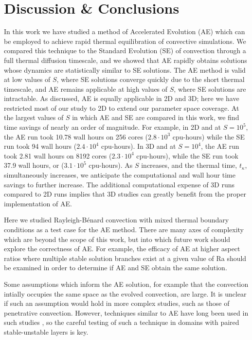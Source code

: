 \documentclass[aps, pre, onecolumn, nofootinbib, notitlepage, groupedaddress, amsfonts, amssymb, amsmath, longbibliography]{revtex4-1}
\newcommand{\RB}{Rayleigh-B\'{e}nard }
\begin{document}


\section{Discussion \& Conclusions}
\label{sec:extensions}
In this work we have studied a method of Accelerated Evolution (AE) which can
be employed to achieve rapid thermal equilibration of convective simulations.  We compared
this technique to the Standard Evolution (SE) of convection through a full thermal diffusion timescale,
and we
showed that AE rapidly obtains solutions whose dynamics are statistically similar to SE solutions.
The AE method is valid at low values of $S$, where SE solutions
converge quickly due to the short thermal timescale, and AE remains applicable
at high values of $S$, where SE solutions are intractable.
As discussed, AE is equally applicable in 2D and 3D; here we have restricted most of our study to 2D
to extend our parameter space coverage.
At the largest values of $S$ in which AE and SE are compared in this work, we find
time savings of nearly an order of magnitude. 
For example, in 2D and at $S = 10^5$, the
AE run took 10.78 wall hours on 256 cores ($2.8\cdot 10^3$ cpu-hours) while the 
SE run took 94 wall hours ($2.4\cdot 10^4$ cpu-hours). In 3D and at $S = 10^4$,
the AE run took 2.81 wall hours on 8192 cores ($2.3 \cdot 10^4$ cpu-hours),
while the SE run took 37.9 wall hours, or ($3.1 \cdot 10^5$ cpu-hours). As $S$ increases,
and the thermal time, $t_{\kappa}$, simultaneously increases, we anticipate the 
computational and wall hour time
savings to further increase.  The additional computational expense of 3D runs compared
to 2D runs implies that 3D studies can greatly benefit from the proper implementation of AE.

Here we studied \RB convection with mixed thermal boundary
conditions as a test case for the AE method. There are many axes of complexity
which are beyond the scope of this work, but into which future work should explore
the correctness of AE. For example, the efficacy of AE at higher aspect ratios
where multiple stable solution branches exist at a given value of Ra should be
examined in order to determine if AE and SE obtain the same solution. 

Some assumptions which inform the AE solution, for example that the convection
intially occupies the same space as the evolved convection, are large. It is
unclear if such an assumption would hold in more complex studies, such as those
of penetrative convection. However, techniques similar to AE have long been used
in such studies \cite{hurlburt&all1986}, so the careful testing of such a 
technique in domains with paired stable-unstable layers is key.
\end{document}
